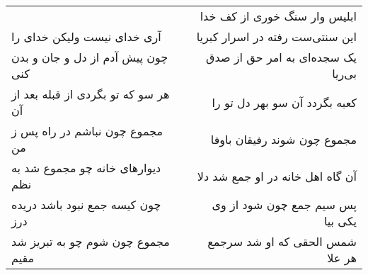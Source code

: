 \begin{center}
\begin{longtable}{l p{0.5cm} r}
&&
ابلیس وار سنگ خوری از کف خدا
\\
آری خدای نیست ولیکن خدای را
&&
این سنتی‌ست رفته در اسرار کبریا
\\
چون پیش آدم از دل و جان و بدن کنی
&&
یک سجده‌ای به امر حق از صدق بی‌ریا
\\
هر سو که تو بگردی از قبله بعد از آن
&&
کعبه بگردد آن سو بهر دل تو را
\\
مجموع چون نباشم در راه پس ز من
&&
مجموع چون شوند رفیقان باوفا
\\
دیوارهای خانه چو مجموع شد به نظم
&&
آن گاه اهل خانه در او جمع شد دلا
\\
چون کیسه جمع نبود باشد دریده درز
&&
پس سیم جمع چون شود از وی یکی بیا
\\
مجموع چون شوم چو به تبریز شد مقیم
&&
شمس الحقی که او شد سرجمع هر علا
\\
\end{longtable}
\end{center}
